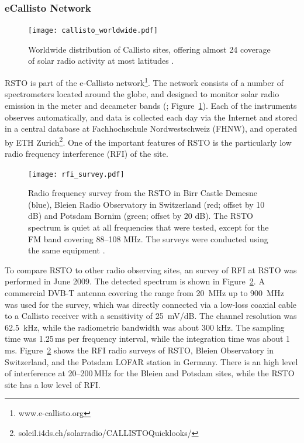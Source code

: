 \subsubsection{eCallisto Network}
\begin{figure}[!t]
\begin{center}
\texttt{[image: callisto\_worldwide.pdf]}
\caption[Callisto Worldwide]{Worldwide distribution of Callisto sites, offering almost 24 coverage of solar radio activity at most latitudes \citep{zucca2012}.}
\label{fig:callisto_worldwide}
\end{center}
\end{figure}
RSTO is part of the e-Callisto network\footnote{www.e-callisto.org}. The network consists of a number of spectrometers located around the globe, and designed to monitor solar radio emission in the meter and decameter bands (\citealt{Benz2009}; Figure~\ref{fig:callisto_worldwide}).  Each of the instruments observes automatically, and data is collected each day via the Internet and stored in a central database at Fachhochschule Nordwestschweiz (FHNW), and operated by ETH Zurich\footnote{soleil.i4ds.ch/solarradio/CALLISTOQuicklooks/}. One of the important features of RSTO is the particularly low radio frequency interference (RFI) of the site. 
\begin{figure}[!t]
\begin{center}
\texttt{[image: rfi\_survey.pdf]}
\caption[RSTO RFI Survey]{Radio frequency survey from the RSTO in Birr Castle Demesne (blue), Bleien Radio Observatory in Switzerland (red; offset by 10 dB) and Potsdam Bornim (green; offset by 20 dB). The RSTO spectrum is quiet at all frequencies that were tested, except for the FM band covering 88--108 MHz. The surveys were conducted using the same equipment \citep{zucca2012}.}
\label{fig:rfisurvey}
\end{center}
\end{figure}

To compare RSTO to other radio observing sites, an survey of RFI at RSTO was performed in June 2009. The detected spectrum is shown in Figure~\ref{fig:rfisurvey}.  A commercial DVB-T antenna covering the range from 20~MHz up to 900~MHz was used for the survey, which was directly connected via a low-loss coaxial cable to a Callisto receiver with a sensitivity of 25~mV/dB. The channel resolution was 62.5~kHz, while the radiometric bandwidth was about 300 kHz. The sampling time was 1.25\,ms per frequency interval, while the integration time was about 1\,ms.  Figure~\ref{fig:rfisurvey} shows the RFI radio surveys of RSTO, Bleien Observatory in Switzerland, and the Potsdam LOFAR station in Germany. There is an high level of interference at 20--200\,MHz for the Bleien and Potsdam sites, while the RSTO site has a low level of RFI.

